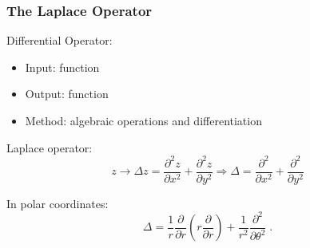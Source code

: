 \begin{frame}
  \frametitle{The Laplace Operator}
Differential Operator:
\begin{itemize}
  \item Input: function
  \item Output: function
  \item Method: algebraic operations and differentiation
\end{itemize}

\pause
Laplace operator:
%
$$z \to \Delta z = \frac{\partial^2 z}{\partial x^2} +\frac{\partial^2 z}{\partial y^2} \Longrightarrow \Delta = \frac{\partial^2 }{\partial x^2} +\frac{\partial^2 }{\partial y^2}$$

\pause
In polar coordinates:
%
$$\Delta = \frac{1}{r}\frac{\partial}{\partial r} \left( r\frac{\partial }{\partial r} \right) +  \frac{1}{r^2}\frac{\partial^2 }{\partial \theta^2}\; .$$
\end{frame}